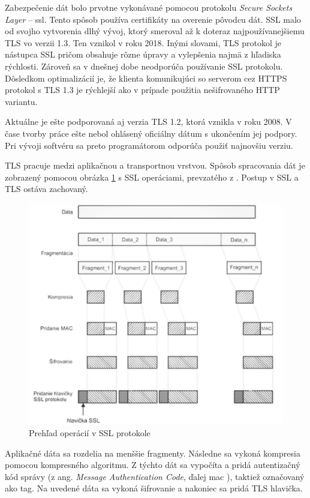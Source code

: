 Zabezpečenie dát bolo prvotne vykonávané pomocou protokolu \textit{Secure Sockets Layer} -- \acrshort{ssl}. Tento spôsob používa certifikáty na overenie pôvodcu dát. SSL malo od svojho vytvorenia dlhý vývoj, ktorý smeroval až k doteraz najpoužívanejšiemu TLS vo verzii 1.3. Ten vznikol v roku 2018. Inými slovami, TLS protokol je nástupca SSL pričom obsahuje rôzne úpravy a vylepšenia najmä z hľadiska rýchlosti. Zároveň sa v dnešnej dobe neodporúča používanie SSL protokolu. Dôsledkom optimalizácií je, že klienta komunikujúci so serverom cez HTTPS protokol s TLS 1.3 je rýchlejší ako v prípade použitia nešifrovaného HTTP variantu. 

Aktuálne je ešte podporovaná aj verzia TLS 1.2, ktorá vznikla v roku 2008. V čase tvorby práce ešte nebol ohlásený oficiálny dátum s ukončením jej podpory. Pri vývoji softvéru sa preto programátorom odporúča použiť najnovšiu verziu. 

TLS pracuje medzi aplikačnou a transportnou vrstvou. Spôsob spracovania dát je zobrazený pomocou obrázka \ref{ssl} s SSL operáciami, prevzatého z \cite{biks}. Postup v SSL a TLS ostáva zachovaný.
 
\begin{figure}[!ht]
	\centering
	\includegraphics[width=0.8\linewidth]{figures/ssl}
	\caption{Prehľad operácií v SSL protokole \cite{tls}}
	\label{ssl}
\end{figure}
Aplikačné dáta sa rozdelia na menššie fragmenty. Následne sa vykoná kompresia pomocou kompresného algoritmu. Z týchto dát sa vypočíta a pridá autentizačný kód správy (z ang. \textit{Message Authentication Code}, ďalej \acrshort{mac} \cite{mac}), taktiež označovaný ako tag. Na uvedené dáta sa vykoná šifrovanie a nakoniec sa pridá TLS hlavička.
   
